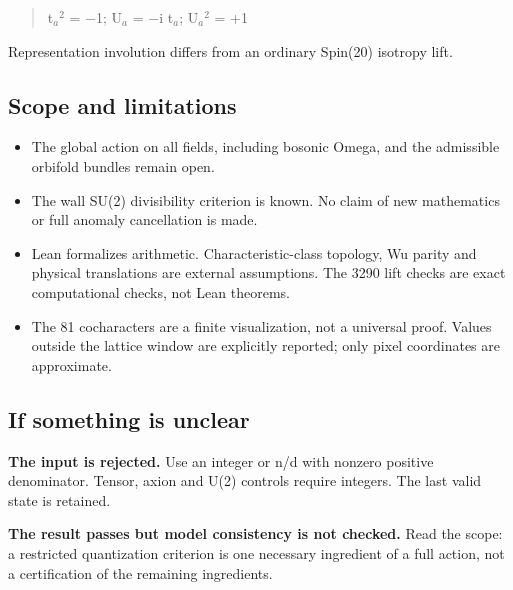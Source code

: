 \documentclass[11pt,a4paper]{article}
\begin{document}
\noindent\begin{minipage}{\linewidth}
\begin{quote}t\ensuremath{{}_{a}}\ensuremath{{}^{2}} = \ensuremath{-}1; U\ensuremath{{}_{a}} = \ensuremath{-}i t\ensuremath{{}_{a}}; U\ensuremath{{}_{a}}\ensuremath{{}^{2}} = +1\end{quote}
Representation involution differs from an ordinary Spin(20) isotropy lift.

\end{minipage}\par\medskip
\subsection*{Scope and limitations}
\begin{itemize}
\item The global action on all fields, including bosonic Omega, and the admissible orbifold bundles remain open.
\item The wall SU(2) divisibility criterion is known. No claim of new mathematics or full anomaly cancellation is made.
\item Lean formalizes arithmetic. Characteristic-class topology, Wu parity and physical translations are external assumptions. The 3290 lift checks are exact computational checks, not Lean theorems.
\item The 81 cocharacters are a finite visualization, not a universal proof. Values outside the lattice window are explicitly reported; only pixel coordinates are approximate.
\end{itemize}
\subsection*{If something is unclear}
\textbf{The input is rejected.} Use an integer or n/d with nonzero positive denominator. Tensor, axion and U(2) controls require integers. The last valid state is retained.

\textbf{The result passes but model consistency is not checked.} Read the scope: a restricted quantization criterion is one necessary ingredient of a full action, not a certification of the remaining ingredients.
\end{document}
